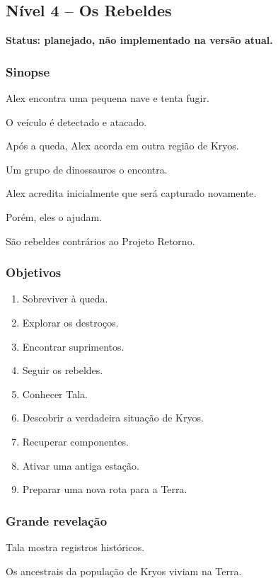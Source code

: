 \documentclass[12pt,a4paper]{article}
\begin{document}
\subsection{Nível 4 -- Os Rebeldes}

\textbf{Status: planejado, não implementado na versão atual.}


\subsubsection*{Sinopse}

Alex encontra uma pequena nave e tenta fugir.

O veículo é detectado e atacado.

Após a queda, Alex acorda em outra região de Kryos.

Um grupo de dinossauros o encontra.

Alex acredita inicialmente que será capturado novamente.

Porém, eles o ajudam.

São rebeldes contrários ao Projeto Retorno.

\subsubsection*{Objetivos}

\begin{enumerate}
    \item Sobreviver à queda.
    \item Explorar os destroços.
    \item Encontrar suprimentos.
    \item Seguir os rebeldes.
    \item Conhecer Tala.
    \item Descobrir a verdadeira situação de Kryos.
    \item Recuperar componentes.
    \item Ativar uma antiga estação.
    \item Preparar uma nova rota para a Terra.
\end{enumerate}

\subsubsection*{Grande revelação}

Tala mostra registros históricos.

Os ancestrais da população de Kryos viviam na Terra.
\end{document}
